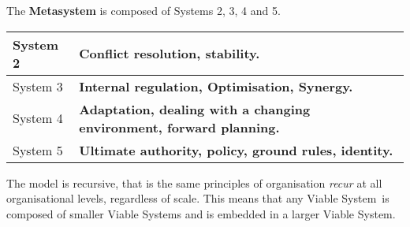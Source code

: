 The \textcolor{M}{\textbf{Metasystem}} is composed of Systems 2, 3, 4 and 5.

\begin{tabular}{|p{} | p{}|}
    \hline
    System 2 & \textbf{Conflict resolution, stability}. \\
    \hline
    System 3 & \textbf{Internal regulation, Optimisation, Synergy.} \\
    \hline
    System 4 & \textbf{Adaptation, dealing with a changing environment, forward planning.} \\
    \hline
    System 5 & \textbf{Ultimate authority, policy, ground rules, identity.}  \\
    \hline
\end{tabular}

The model is recursive, that is the same principles of organisation \textit{recur} at all organisational levels, regardless of scale. This means that any Viable System is composed of smaller Viable Systems and is embedded in a larger Viable System.
